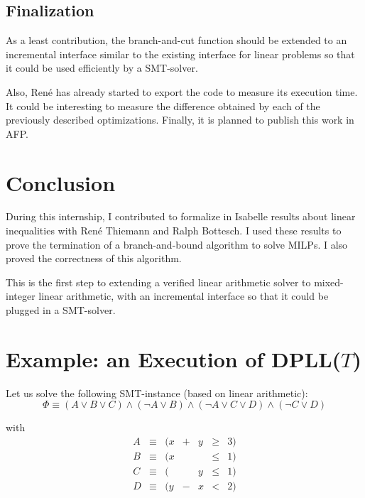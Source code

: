 \documentclass{article}
\begin{document}
\subsection{Finalization}
As a least contribution, the branch-and-cut function should be extended to an
incremental interface similar to the existing interface for linear problems so
that it could be used efficiently by a SMT-solver.

Also, René has already started to export the code to measure its execution
time. It could be interesting to measure the difference obtained by each of the
previously described optimizations. Finally, it is planned to publish this
work in AFP.

\section*{Conclusion}
During this internship, I contributed to formalize in Isabelle results about
linear inequalities with René Thiemann and Ralph Bottesch. I used these results
to prove the termination of a branch-and-bound algorithm to solve MILPs. I also
proved the correctness of this algorithm.

This is the first step to extending a verified linear arithmetic solver to
mixed-integer linear arithmetic, with an incremental interface so that it could
be plugged in a SMT-solver.




\appendix

\section{Example: an Execution of DPLL($T$)}
\label{dpll}
Let us solve the following SMT-instance (based on linear arithmetic):
$$\Phi \equiv (A \vee B \vee C) \wedge (\neg A \vee B) \wedge
              (\neg A \vee C \vee D) \wedge (\neg C \vee D)$$

with
\begin{displaymath}
\begin{array}{cclcccc}
  A & \equiv & (x & + & y & \geqslant & 3) \\
  B & \equiv & (x &   &   & \leqslant & 1) \\
  C & \equiv & (  &   & y & \leqslant & 1) \\
  D & \equiv & (y & - & x & <         & 2) \\
\end{array}
\end{displaymath}
\end{document}
